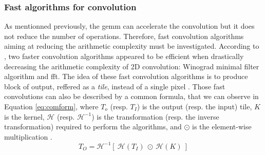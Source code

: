 \subsubsection{Fast algorithms for convolution}
%
%
As mentionned previously, the \acrshort{gemm} can accelerate the convolution but it does not reduce the number of operations. Therefore, fast convolution algorithms aiming at reducing the arithmetic complexity must be investigated. According to \textcite{liang_evaluating_2020}, two faster convolution algorithms appeared to be efficient when drastically decreasing the arithmetic complexity of 2D convolution: Winograd minimal filter algorithm and \acrfull{fft}. The idea of these fast convolution algorithms is to produce block of output, reffered as a \textit{tile}, instead of a single pixel \cite{abdelouahab_accelerating_2018}. Those fast convolutions can also be described by a common formula, that we can observe in Equation \eqref{eq:comform}, where $T_o$ (resp. $T_I$) is the output (resp. the input) tile, $K$ is the kernel, $\mathcal{H}$ (resp. $\mathcal{H}^{-1}$) is the transformation (resp. the inverse transformation) required to perform the algorithms, and $\odot$ is the element-wise multiplication \cite{liang_evaluating_2020}.
%
\begin{equation}
    T_O = \mathcal{H}^{-1} [ \ \mathcal{H}(T_I) \ \odot \ \mathcal{H}(K) \ ]
    \label{eq:comform}
\end{equation}
%
